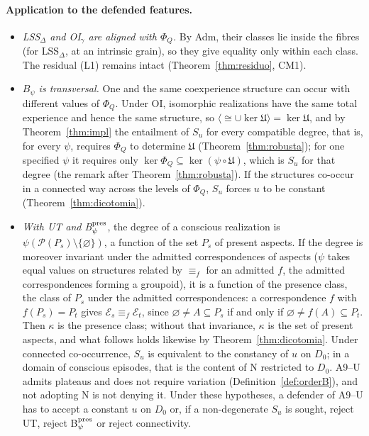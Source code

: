 \paragraph{Application to the defended features.}
\begin{itemize}
\item \emph{LSS$_\Delta$ and OI$_\gamma$ are aligned with $\Phi_Q$.} By Adm, their classes lie inside the fibres (for LSS$_\Delta$, at an intrinsic grain), so they give equality only within each class. The residual (L1) remains intact (Theorem~\ref{thm:residuo}, CM1).
\item \emph{$B_\psi$ is transversal.} One and the same coexperience structure can occur with different values of $\Phi_Q$. Under OI, isomorphic realizations have the same total experience and hence the same structure, so $\langle\cong\cup\ker\mathfrak U\rangle=\ker\mathfrak U$, and by Theorem~\ref{thm:impl} the entailment of $S_u$ for every compatible degree, that is, for every $\psi$, requires $\Phi_Q$ to determine $\mathfrak U$ (Theorem~\ref{thm:robusta}); for one specified $\psi$ it requires only $\ker\Phi_Q\subseteq\ker(\psi\circ\mathfrak U)$, which is $S_u$ for that degree (the remark after Theorem~\ref{thm:robusta}). If the structures co-occur in a connected way across the levels of $\Phi_Q$, $S_u$ forces $u$ to be constant (Theorem~\ref{thm:dicotomia}).
\item \emph{With UT and B$_\psi^{\rm pres}$}, the degree of a conscious realization is $\psi(\mathcal P(P_s)\setminus\{\varnothing\})$, a function of the set $P_s$ of present aspects. If the degree is moreover invariant under the admitted correspondences of aspects ($\psi$ takes equal values on structures related by $\equiv_f$ for an admitted $f$, the admitted correspondences forming a groupoid), it is a function of the presence class, the class of $P_s$ under the admitted correspondences: a correspondence $f$ with $f(P_s)=P_t$ gives $\mathcal E_s\equiv_f\mathcal E_t$, since $\varnothing\ne A\subseteq P_s$ if and only if $\varnothing\ne f(A)\subseteq P_t$. Then $\kappa$ is the presence class; without that invariance, $\kappa$ is the set of present aspects, and what follows holds likewise by Theorem~\ref{thm:dicotomia}. Under connected co-occurrence, $S_u$ is equivalent to the constancy of $u$ on $D_0$; in a domain of conscious episodes, that is the content of N restricted to $D_0$. A9--U admits plateaus and does not require variation (Definition~\ref{def:orderB}), and not adopting N is not denying it. Under these hypotheses, a defender of A9--U has to accept a constant $u$ on $D_0$ or, if a non-degenerate $S_u$ is sought, reject UT, reject B$_\psi^{\rm pres}$ or reject connectivity.
\end{itemize}
